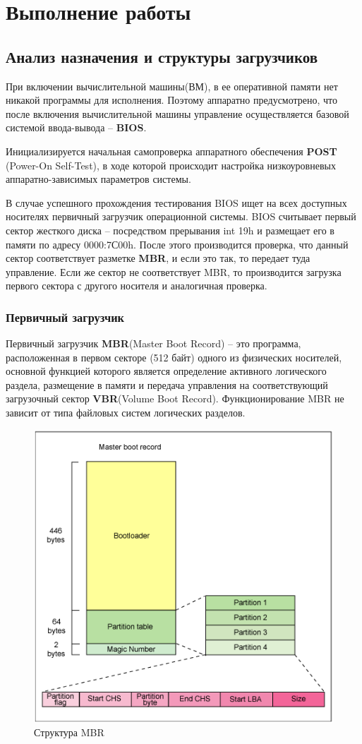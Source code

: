 \section{Выполнение работы}
\subsection{Анализ назначения и структуры загрузчиков}
При включении вычислительной машины(ВМ), в ее оперативной памяти нет никакой программы для исполнения. Поэтому аппаратно предусмотрено, что после включения вычислительной машины управление осуществляется базовой системой ввода-вывода – \textbf{BIOS}.

Инициализируется начальная самопроверка аппаратного обеспечения \textbf{POST} (Power-On Self-Test), в ходе которой происходит настройка низкоуровневых аппаратно-зависимых параметров системы. 

В случае успешного прохождения тестирования BIOS ищет на всех доступных носителях первичный загрузчик операционной системы. BIOS считывает первый сектор жесткого диска – посредством прерывания int 19h и размещает его в памяти по адресу 0000:7С00h\cite{int19}. После этого производится проверка, что данный сектор соответствует разметке \textbf{MBR}, и если это так, то передает туда управление. Если же сектор не соответствует MBR, то производится загрузка первого сектора с другого носителя и аналогичная проверка.

\subsubsection{Первичный загрузчик}
Первичный загрузчик \textbf{MBR}(Master Boot Record) – это программа, расположенная в первом секторе (512 байт) одного из физических носителей, основной функцией которого является определение активного логического раздела, размещение в памяти и передача управления на соответствующий загрузочный сектор \textbf{VBR}(Volume Boot Record). Функционирование MBR не зависит от типа файловых систем логических разделов.

\begin{figure}[H]
  \centering
  \includegraphics[width=.7\textwidth]{img/mbr}
  \caption{Структура MBR}
\end{figure}

